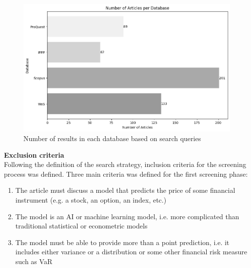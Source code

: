 \begin{figure}[H]
    \centering
    \includegraphics[width=1\linewidth]{Images/search_sample_by_database.png}
    \caption{Number of results in each database based on search queries}
    \label{fig:search_sample_by_database}
\end{figure}



\textbf{Exclusion criteria} \\
Following the definition of the search strategy, inclusion criteria for the screening process was defined. Three main criteria was defined for the first screening phase:

\begin{enumerate}
    \item The article must discuss a model that predicts the price of some financial instrument (e.g. a stock, an option, an index, etc.)
    \item The model is an AI or machine learning model, i.e. more complicated than traditional statistical or econometric models
    \item The model must be able to provide more than a point prediction, i.e. it includes either variance or a distribution or some other financial risk measure such as VaR
\end{enumerate}

